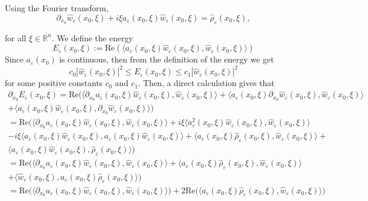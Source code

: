 \documentclass[12pt]{amsart}
\theoremstyle{definition}
\begin{document}
Using the Fourier transform,
\[
\partial_{x_0} \hat{w}_\varepsilon(x_0, \xi) + i \xi a_\varepsilon(x_0, \xi) \hat{w}_\varepsilon(x_0, \xi) = \hat{\rho}_\varepsilon(x_0, \xi),
\]

for all $\xi \in \mathbb{R}^n$. We define the energy
\[
E_\varepsilon(x_0, \xi) := \mathrm{Re}(\langle a_\varepsilon(x_0, \xi) \hat{w}_\varepsilon(x_0, \xi), \hat{w}_\varepsilon(x_0, \xi)\rangle)
\]
Since $a_\varepsilon(x_0)$ is continuous, then from the definition of the energy we get
\begin{equation}
\label{eq3.12}
c_0 |\hat{w}_\varepsilon(x_0, \xi)|^2 \leq E_\varepsilon(x_0, \xi) \leq c_1 |\hat{w}_\varepsilon(x_0, \xi)|^2
\end{equation}
for some positive constants $c_0$ and $c_1$. Then, a direct calculation gives that
\begin{gather*}
\partial_{x_0} E_\varepsilon(x_0, \xi) = \mathrm{Re}\big(\langle \partial_{x_0} a_\varepsilon(x_0, \xi)\hat{w}_\varepsilon(x_0, \xi), \hat{w}_\varepsilon(x_0, \xi)\rangle + \langle a_\varepsilon(x_0, \xi) \partial_{x_0} \hat{w}_\varepsilon(x_0, \xi), \hat{w}_\varepsilon(x_0, \xi)\rangle\\ + \langle a_\varepsilon(x_0, \xi) \hat{w}_\varepsilon(x_0, \xi), \partial_{x_0} \hat{w}_\varepsilon(x_0, \xi)\rangle\big)\\             
= \mathrm{Re}\big(\langle\partial_{x_0} a_\varepsilon(x_0, \xi) \hat{w}_\varepsilon(x_0, \xi), \hat{w}_\varepsilon(x_0, \xi)\rangle + i \xi \langle a^2_\varepsilon(x_0, \xi)\hat{w}_\varepsilon(x_0, \xi), \hat{w}_\varepsilon(x_0, \xi)\rangle\\
- i \xi \langle a_\varepsilon(x_0, \xi)\hat{w}_\varepsilon(x_0, \xi), a_\varepsilon(x_0, \xi) \hat{w}_\varepsilon(x_0, \xi)\rangle + \langle a_\varepsilon(x_0, \xi)\hat{\rho}_\varepsilon(x_0, \xi), \hat{w}_\varepsilon(x_0, \xi)\rangle +\\ \langle a_\varepsilon(x_0, \xi)\hat{w}_\varepsilon(x_0, \xi), \hat{\rho}_\varepsilon(x_0, \xi)\rangle\big)\\
= \mathrm{Re}\big( \langle \partial_{x_0} a_\varepsilon(x_0, \xi)\hat{w}_\varepsilon(x_0, \xi), \hat{w}_\varepsilon(x_0, \xi) \rangle + \langle a_\varepsilon(x_0, \xi)\hat{\rho}_\varepsilon(x_0, \xi), \hat{w}_\varepsilon(x_0, \xi)\rangle \\+ \langle\hat{w}_\varepsilon(x_0, \xi), a_\varepsilon(x_0, \xi) \hat{\rho}_\varepsilon(x_0, \xi)\rangle\big)\\ = \mathrm{Re}\big(\langle\partial_{x_0} a_\varepsilon(x_0, \xi)\hat{w}_\varepsilon(x_0, \xi), \hat{w}_\varepsilon(x_0, \xi)\rangle \big) + 2 \text{Re}\big( \langle a_\varepsilon(x_0, \xi) \hat{\rho}_\varepsilon(x_0, \xi), \hat{w}_\varepsilon(x_0, \xi)\rangle\big)
\end{gather*}
\end{document}
